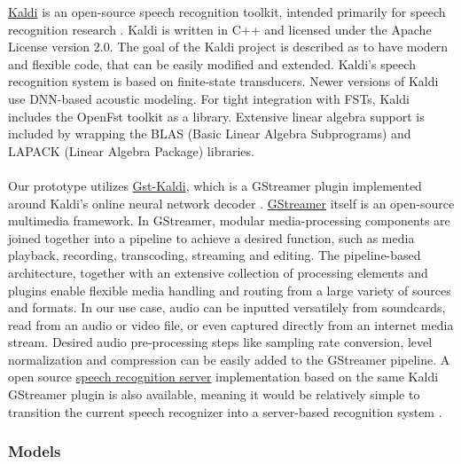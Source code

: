 \documentclass[english, 12pt, a4paper, pdftex, elec, utf8]{aaltothesis}
\begin{document}
\href{http://kaldi-asr.org}{Kaldi} is an open-source speech recognition toolkit, intended primarily for speech recognition research \cite{kaldi}. Kaldi is written in C++ and licensed under the Apache License version 2.0. The goal of the Kaldi project is described as to have modern and flexible code, that can be easily modified and extended. Kaldi's speech recognition system is based on finite-state transducers. Newer versions of Kaldi use DNN-based acoustic modeling. For tight integration with FSTs, Kaldi includes the OpenFst toolkit as a library. Extensive linear algebra support is included by wrapping the BLAS (Basic Linear Algebra Subprograms) and LAPACK (Linear Algebra Package) libraries. \\\\
Our prototype utilizes \href{https://github.com/alumae/gst-kaldi-nnet2-online}{Gst-Kaldi}, which is a GStreamer plugin implemented around Kaldi's online neural network decoder \cite{alumae2014full}. \href{https://gstreamer.freedesktop.org/}{GStreamer} itself is an open-source multimedia framework. In GStreamer, modular media-processing components are joined together into a pipeline to achieve a desired function, such as media playback, recording, transcoding, streaming and editing. The pipeline-based architecture, together with an extensive collection of processing elements and plugins enable flexible media handling and routing from a large variety of sources and formats. In our use case, audio can be inputted versatilely from soundcards, read from an audio or video file, or even captured directly from an internet media stream. Desired audio pre-processing steps like sampling rate conversion, level normalization and compression can be easily added to the GStreamer pipeline. A open source \href{https://github.com/alumae/kaldi-gstreamer-server}{speech recognition server} implementation based on the same Kaldi GStreamer plugin is also available, meaning it would be relatively simple to transition the current speech recognizer into a server-based recognition system \cite{alumae2012open}.

\subsubsection{Models} \label{sec:models}
\end{document}
